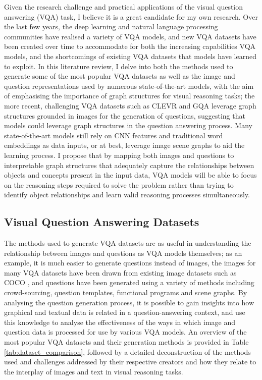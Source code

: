 Given the research challenge and practical applications of the visual question answering (VQA) task, I believe it is a great candidate for my own research. Over the last few years, the deep learning and natural language processing communities have realised a variety of VQA models, and new VQA datasets have been created over time to accommodate for both the increasing capabilities VQA models, and the shortcomings of existing VQA datasets that models have learned to exploit. In this literature review, I delve into both the methods used to generate some of the most popular VQA datasets as well as the image and question representations used by numerous state-of-the-art models, with the aim of emphasising the importance of graph structures for visual reasoning tasks; the more recent, challenging VQA datasets such as CLEVR \cite{johnson2017clevr} and GQA \cite{hudson2019gqa} leverage graph structures grounded in images for the generation of questions, suggesting that models could leverage graph structures in the question answering process. Many state-of-the-art models \cite{hudson2018compositional} still rely on CNN features and traditional word embeddings as data inputs, or at best, leverage image scene graphs to aid the learning process. I propose that by mapping both images and questions to interpretable graph structures that adequately capture the relationships between objects and concepts present in the input data, VQA models will be able to focus on the reasoning steps required to solve the problem rather than trying to identify object relationships and learn valid reasoning processes simultaneously.

\pagebreak

\subsection*{Visual Question Answering Datasets}

The methods used to generate VQA datasets are as useful in understanding the relationship between images and questions as VQA models themselves; as an example, it is much easier to generate questions instead of images, the images for many VQA datasets have been drawn from existing image datasets such as COCO \cite{lin2014microsoft}, and questions have been generated using a variety of methods including crowd-sourcing, question templates, functional programs and scene graphs. By analysing the question generation process, it is possible to gain insights into how graphical and textual data is related in a question-answering context, and use this knowledge to analyse the effectiveness of the ways in which image and question data is processed for use by various VQA models. An overview of the most popular VQA datasets and their generation methods is provided in Table \ref{tab:dataset_comparison}, followed by a detailed deconstruction of the methods used and challenges addressed by their respective creators and how they relate to the interplay of images and text in visual reasoning tasks.

